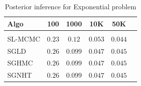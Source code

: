\documentclass[]{article}
\begin{document}
\begin{table}[h]
\caption{Posterior inference for Exponential problem}
\label{tab:exp-prob-no-sticky}
\begin{center}
\begin{tabular}{l||c|c|c|c|c}
{\bf Algo}  & 100 & 1000 & 10K & 50K \\
\hline \\
SL-MCMC &  $0.23$ & $0.12$ & $0.053$ & $0.044$ \\
SGLD    &  $0.26$ & $0.099$ & $0.047$ & $0.045$ \\
SGHMC   &  $0.26$ & $0.099$ & $0.047$ & $0.045$ \\
SGNHT   &  $0.26$ & $0.099$ & $0.047$ & $0.045$ \\
\end{tabular}
\end{center}
\end{table}

% 
% 

%
%
% 
%
%
\end{document}

